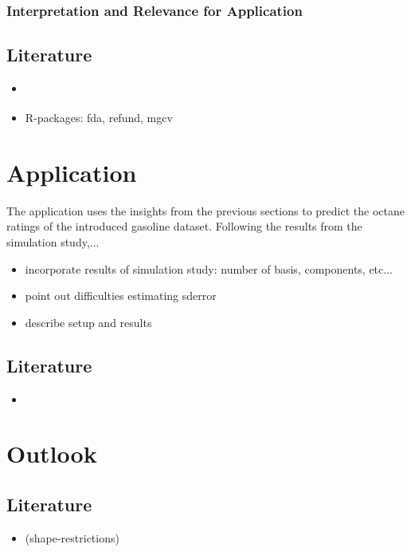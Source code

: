 \documentclass[11pt,twoside,a4paper]{article}
\begin{document}
	\subsubsection{Interpretation and Relevance for Application}

	\subsection{Literature}
	\begin{itemize}
		\item \cite{shonkwiler_explorations_2009}
		\item R-packages: fda, refund, mgcv
	\end{itemize}
	
	\newpage
	\section{Application}
		The application uses the insights from the previous sections to predict the octane ratings of the introduced gasoline dataset. Following the results from the simulation study,... 
		\begin{itemize}
			\item {\color{green} incorporate results of simulation study: number of basis, components, etc...}
			\item point out difficulties estimating sderror
			\item describe setup and results
\end{itemize}
	
	\subsection{Literature}
	\begin{itemize}
		\item \cite{carey_life_2002}
	\end{itemize}

	\section{Outlook}
	
	\subsection{Literature}
	\begin{itemize}
		\item \cite{James.2009} (shape-restrictions)
	\end{itemize}
	
\end{document}
